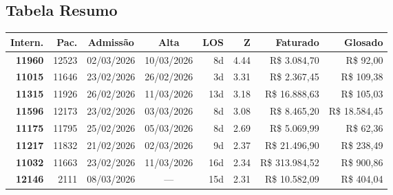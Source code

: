 \documentclass[a4paper,10pt]{article}
\begin{document}
\subsection{Tabela Resumo}
\begin{center}
\begin{longtable}{>{\scriptsize}r>{\scriptsize}r>{\scriptsize}c>{\scriptsize}c>{\scriptsize}r>{\scriptsize}r>{\scriptsize}r>{\scriptsize}r}
\toprule
\textbf{Intern.} & \textbf{Pac.} & \textbf{Admiss\~{a}o} & \textbf{Alta} & \textbf{LOS} & \textbf{Z} & \textbf{Faturado} & \textbf{Glosado} \\
\midrule
\endhead
\bottomrule
\endfoot

\textcolor{anomorange}{\textbf{11960}} & 12523 & 02/03/2026 & 10/03/2026 & 8d & \textcolor{anomorange}{4.44} & R\$ 3.084,70 & \textcolor{anomred}{R\$ 92,00} \\

\textcolor{anomorange}{\textbf{11015}} & 11646 & 23/02/2026 & 26/02/2026 & 3d & \textcolor{anomorange}{3.31} & R\$ 2.367,45 & \textcolor{anomred}{R\$ 109,38} \\

\textcolor{anomorange}{\textbf{11315}} & 11926 & 26/02/2026 & 11/03/2026 & 13d & \textcolor{anomorange}{3.18} & R\$ 16.888,63 & \textcolor{anomred}{R\$ 105,03} \\

\textcolor{anomorange}{\textbf{11596}} & 12173 & 23/02/2026 & 03/03/2026 & 8d & \textcolor{anomorange}{3.08} & R\$ 8.465,20 & \textcolor{anomred}{R\$ 18.584,45} \\

\textcolor{anomyellow}{\textbf{11175}} & 11795 & 25/02/2026 & 05/03/2026 & 8d & \textcolor{anomyellow}{2.69} & R\$ 5.069,99 & \textcolor{anomred}{R\$ 62,36} \\

\textcolor{anomyellow}{\textbf{11217}} & 11832 & 21/02/2026 & 02/03/2026 & 9d & \textcolor{anomyellow}{2.37} & R\$ 21.496,90 & \textcolor{anomred}{R\$ 238,49} \\

\textcolor{anomyellow}{\textbf{11032}} & 11663 & 23/02/2026 & 11/03/2026 & 16d & \textcolor{anomyellow}{2.34} & R\$ 313.984,52 & \textcolor{anomred}{R\$ 900,86} \\

\textcolor{anomyellow}{\textbf{12146}} & 2111 & 08/03/2026 & — & 15d & \textcolor{anomyellow}{2.31} & R\$ 10.582,09 & \textcolor{anomred}{R\$ 404,04} \\


\end{longtable}
\end{center}
\end{document}
